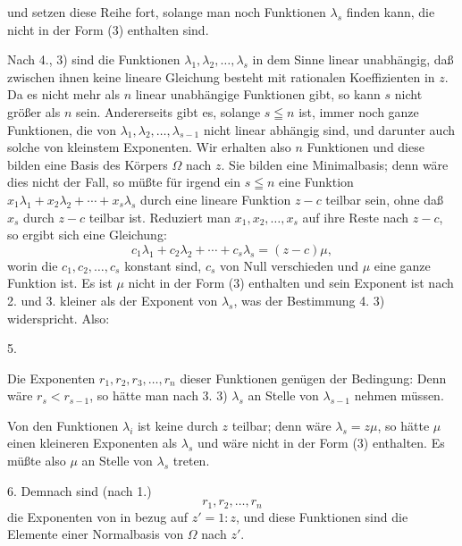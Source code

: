 und setzen diese Reihe fort, solange man noch Funktionen $\lambda_s$ finden kann, die nicht in der Form (3) enthalten sind.

Nach 4., 3) sind die Funktionen $\lambda_1, \lambda_2, \ldots, \lambda_s$ in dem Sinne linear unabhängig, daß zwischen ihnen keine lineare Gleichung besteht mit rationalen Koeffizienten in $z$. Da es nicht mehr als $n$ linear unabhängige Funktionen gibt, so kann $s$ nicht größer als $n$ sein. Andererseits gibt es, solange $s \leqq n$ ist, immer noch ganze Funktionen, die von $\lambda_1, \lambda_2, \ldots, \lambda_{s-1}$ nicht linear abhängig sind, und darunter auch solche von kleinstem Exponenten. Wir erhalten also $n$ Funktionen
und diese bilden eine Basis des Körpers $\Omega$ nach $z$. Sie bilden eine Minimalbasis; denn wäre dies nicht der Fall, so müßte für irgend ein $s \leqq n$ eine Funktion $x_1\lambda_1 + x_2\lambda_2 + \cdots + x_s\lambda_s$ durch eine lineare Funktion $z - c$ teilbar sein, ohne daß $x_s$ durch $z - c$ teilbar ist. Reduziert man $x_1, x_2, \ldots, x_s$ auf ihre Reste nach $z - c$, so ergibt sich eine Gleichung:
\[
c_1\lambda_1 + c_2\lambda_2 + \cdots + c_s\lambda_s = (z - c)\mu,
\]
worin die $c_1, c_2, \ldots, c_s$ konstant sind, $c_s$ von Null verschieden und $\mu$ eine ganze Funktion ist. Es ist $\mu$ nicht in der Form (3) enthalten und sein Exponent ist nach 2. und 3. kleiner als der Exponent von $\lambda_s$, was der Bestimmung 4. 3) widerspricht. Also:

5. 

Die Exponenten $r_1, r_2, r_3, \ldots, r_n$ dieser Funktionen genügen der Bedingung:
Denn wäre $r_s < r_{s-1}$, so hätte man nach 3. 3) $\lambda_s$ an Stelle von $\lambda_{s-1}$ nehmen müssen.

Von den Funktionen $\lambda_i$ ist keine durch $z$ teilbar; denn wäre $\lambda_s = z\mu$, so hätte $\mu$ einen kleineren Exponenten als $\lambda_s$ und wäre nicht in der Form (3) enthalten. Es müßte also $\mu$ an Stelle von $\lambda_s$ treten.

6. Demnach sind (nach 1.)
\[
r_1, r_2, \ldots, r_n
\]
die Exponenten von
in bezug auf $z' = 1:z$, und diese Funktionen sind die Elemente einer Normalbasis von $\Omega$ nach $z'$.
